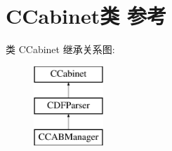 \hypertarget{class_c_cabinet}{}\section{C\+Cabinet类 参考}
\label{class_c_cabinet}
类 C\+Cabinet 继承关系图\+:\begin{figure}[H]
\begin{center}
\leavevmode
\includegraphics[height=3.000000cm]{class_c_cabinet}
\end{center}
\end{figure}
